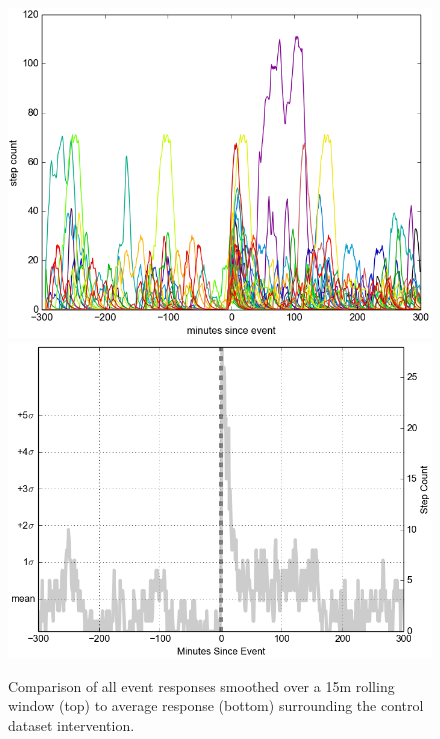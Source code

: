 \begin{figure}
\centering
\includegraphics[width=0.9\columnwidth]{./img/perfect_intervention_individual_events_smoothed.png}
\includegraphics[width=0.9\columnwidth]{./img/perfect_intervention.png}
\caption{Comparison of all event responses smoothed over a 15m rolling window (top) to average response (bottom) surrounding the control dataset intervention.}
\label{fig:interventionAverage}
\end{figure}

